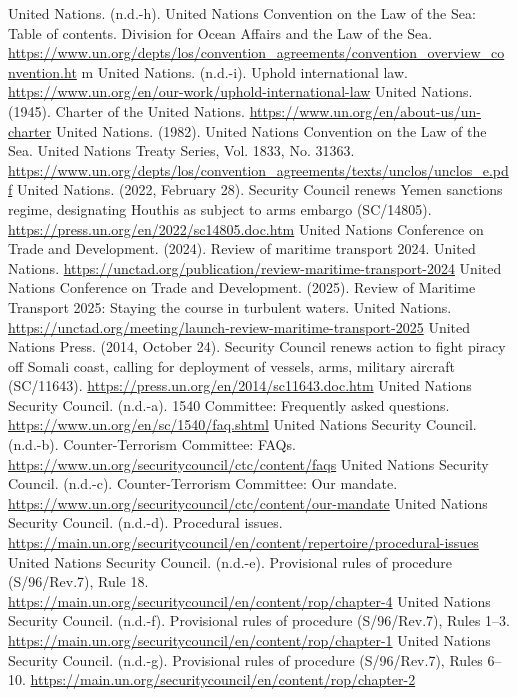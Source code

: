 \begin{referencelist}
   United Nations. (n.d.-h). United Nations Convention on the Law of the Sea: Table of contents. Division for Ocean Affairs and the Law of the Sea. \url{https://www.un.org/depts/los/convention_agreements/convention_overview_convention.ht} m
   United Nations. (n.d.-i). Uphold international law. \url{https://www.un.org/en/our-work/uphold-international-law}
   United Nations. (1945). Charter of the United Nations. \url{https://www.un.org/en/about-us/un-charter}
   United Nations. (1982). United Nations Convention on the Law of the Sea. United Nations Treaty Series, Vol. 1833, No. 31363. \url{https://www.un.org/depts/los/convention_agreements/texts/unclos/unclos_e.pdf}
   United Nations. (2022, February 28). Security Council renews Yemen sanctions regime, designating Houthis as subject to arms embargo (SC/14805). \url{https://press.un.org/en/2022/sc14805.doc.htm}
   United Nations Conference on Trade and Development. (2024). Review of maritime transport 2024. United Nations. \url{https://unctad.org/publication/review-maritime-transport-2024}
   United Nations Conference on Trade and Development. (2025). Review of Maritime Transport 2025: Staying the course in turbulent waters. United Nations. \url{https://unctad.org/meeting/launch-review-maritime-transport-2025}
   United Nations Press. (2014, October 24). Security Council renews action to fight piracy off Somali coast, calling for deployment of vessels, arms, military aircraft (SC/11643). \url{https://press.un.org/en/2014/sc11643.doc.htm}
   United Nations Security Council. (n.d.-a). 1540 Committee: Frequently asked questions. \url{https://www.un.org/en/sc/1540/faq.shtml}
   United Nations Security Council. (n.d.-b). Counter-Terrorism Committee: FAQs. \url{https://www.un.org/securitycouncil/ctc/content/faqs}
   United Nations Security Council. (n.d.-c). Counter-Terrorism Committee: Our mandate. \url{https://www.un.org/securitycouncil/ctc/content/our-mandate}
   United Nations Security Council. (n.d.-d). Procedural issues. \url{https://main.un.org/securitycouncil/en/content/repertoire/procedural-issues}
   United Nations Security Council. (n.d.-e). Provisional rules of procedure (S/96/Rev.7), Rule 18. \url{https://main.un.org/securitycouncil/en/content/rop/chapter-4}
   United Nations Security Council. (n.d.-f). Provisional rules of procedure (S/96/Rev.7), Rules 1–3. \url{https://main.un.org/securitycouncil/en/content/rop/chapter-1}
   United Nations Security Council. (n.d.-g). Provisional rules of procedure (S/96/Rev.7), Rules 6–10. \url{https://main.un.org/securitycouncil/en/content/rop/chapter-2}

\end{referencelist}
